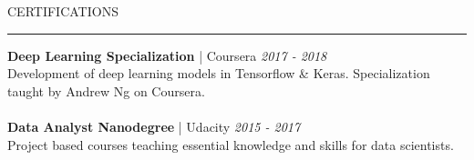 \documentclass[11pt,a4paper]{article}
\newcommand{\textline}[3]{\normalsize \textbf{#1} | #2 \hfill \textit{#3}}
\newcommand{\headline}[1]{\Large \textcolor{myblue}{#1}}
\begin{document}
\begin{minipage}[t]{0.66\linewidth}
    {\headline{CERTIFICATIONS}}
    \vspace{0.2cm}
    {\color{myblue}\hrule height 0.3mm}
    \vspace{0.2cm}
    \textline{Deep Learning Specialization}{Coursera}{2017 - 2018}\\
    \footnotesize Development of deep learning models in Tensorflow \& Keras. Specialization taught by Andrew Ng on Coursera.\\
    \\
    \textline{Data Analyst Nanodegree}{Udacity}{2015 - 2017} \\
    \footnotesize Project based courses teaching essential knowledge and skills for data scientists.\\
  \end{minipage}\hfill
\begin{minipage}[t]{0.28\linewidth}


\end{minipage}
\end{document}
